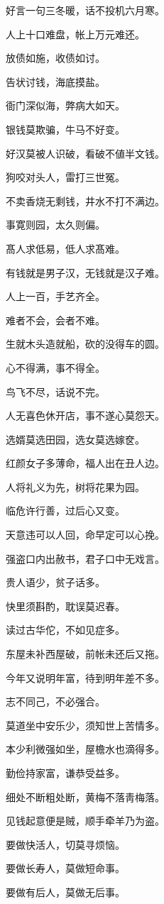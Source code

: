 \documentclass[12pt,oneside]{book}
\begin{document}
好言一句三冬暖，话不投机六月寒。

人上十口难盘，帐上万元难还。

放债如施，收债如讨。

告状讨钱，海底摸盐。

衙门深似海，弊病大如天。

银钱莫欺骗，牛马不好变。

好汉莫被人识破，看破不値半文钱。

狗咬对头人，雷打三世冤。

不卖香烧无剩钱，井水不打不满边。

事寛则园，太久则偏。

髙人求低易，低人求髙难。

有钱就是男子汉，无钱就是汉子难。

人上一百，手艺齐全。

难者不会，会者不难。

生就木头造就船，砍的没得车的圆。

心不得满，事不得全。

鸟飞不尽，话说不完。

人无喜色休开店，事不遂心莫怨天。

选婿莫选田园，选女莫选嫁奁。

红颜女子多薄命，福人出在丑人边。

人将礼义为先，树将花果为园。

临危许行善，过后心又变。

天意违可以人回，命早定可以心挽。

强盗口内出赦书，君子口中无戏言。

贵人语少，贫子话多。

快里须斟酌，耽误莫迟春。

读过古华佗，不如见症多。

东屋未补西屋破，前帐未还后又拖。

今年又说明年富，待到明年差不多。

志不同己，不必强合。

莫道坐中安乐少，须知世上苦情多。

本少利微强如坐，屋檐水也滴得多。

勤俭持家富，谦恭受益多。

细处不断粗处断，黄梅不落靑梅落。

见钱起意便是贼，顺手牵羊乃为盗。

要做快活人，切莫寻烦恼。

要做长寿人，莫做短命事。

要做有后人，莫做无后事。
\end{document}
